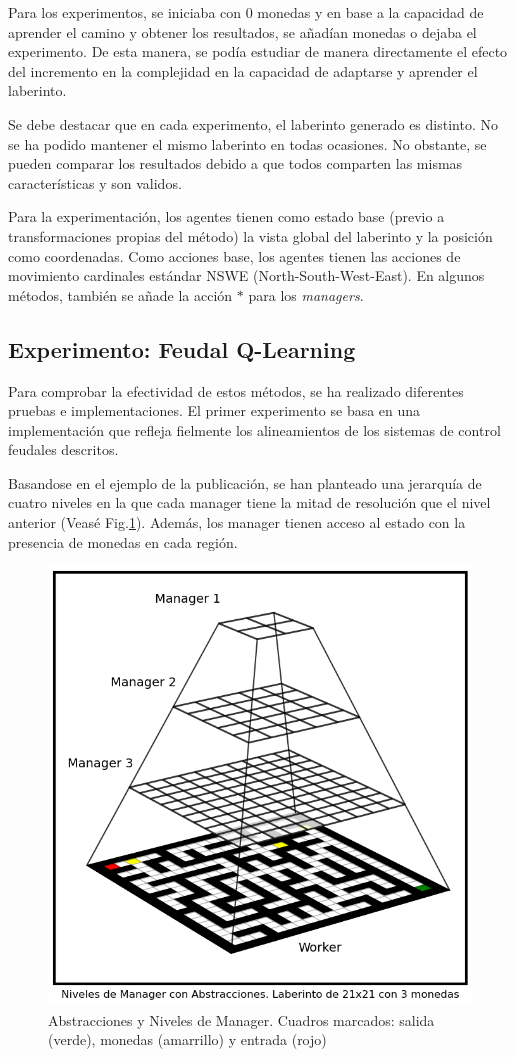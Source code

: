 \documentclass[letterpaper]{article} %
\begin{document}
Para los experimentos, se iniciaba con 0 monedas y en base a la capacidad de aprender el camino y obtener los resultados, se añadían monedas o dejaba el experimento.
De esta manera, se podía estudiar de manera directamente el efecto del incremento en la complejidad en la capacidad de adaptarse y aprender el laberinto. 

Se debe destacar que en cada experimento, el laberinto generado es distinto. No se ha podido mantener el mismo laberinto en todas ocasiones. No obstante,
se pueden comparar los resultados debido a que todos comparten las mismas características y son validos.

Para la experimentación, los agentes tienen como estado base (previo a transformaciones propias del método) la vista global del laberinto y la posición como coordenadas. 
Como acciones base, los agentes tienen las acciones de movimiento cardinales estándar NSWE (North-South-West-East). En algunos métodos, 
también se añade la acción $*$ para los \textit{managers}.

\subsection{Experimento: Feudal Q-Learning}
Para comprobar la efectividad de estos métodos, se ha realizado diferentes pruebas e implementaciones. El primer experimento
se basa en una implementación que refleja fielmente los alineamientos de los sistemas de control feudales descritos. 

Basandose en el ejemplo de la publicación, se han planteado una jerarquía de cuatro niveles en la que cada manager tiene la mitad de resolución 
que el nivel anterior (Veasé Fig.\ref{fig:feudal-abstract}). Además, los manager tienen acceso al estado con la presencia de monedas en cada región.  

\begin{figure}[H]
    \centering
    \includegraphics[width=0.7\columnwidth]{abstractions.png}
    \caption{Abstracciones y Niveles de Manager. Cuadros marcados: salida (verde), monedas (amarrillo) y entrada (rojo) \label{fig:feudal-abstract}}
\end{figure}
\end{document}
